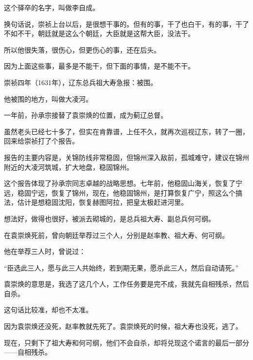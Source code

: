 \begin{multicols}{\theparacolNo}
这个驿卒的名字，叫做李自成。

换句话说，崇祯上台以后，是很想干事的。但有的事，干了也白干，有的事，干了不如不干，朝廷就是这么个朝廷，大臣就是这帮大臣，没法干。

所以他很失落，很伤心，但更伤心的事，还在后头。

因为上面这些事，最多是不能干，但下面的事情，是不能不干。

崇祯四年（1631年），辽东总兵祖大寿急报：被围。

他被围的地方，叫做大凌河。

一年前，孙承宗接替了袁崇焕的位置，成为蓟辽总督。

虽然老头已经七十多了，但实在肯靠谱，上任不久，就再次巡视辽东，转了一圈，回来给崇祯打了个报告。

报告的主要内容是，关锦防线非常稳固，但锦州深入敌前，孤城难守，建议在锦州附近的大凌河筑城，扩大地盘，稳固锦州。

这个报告体现了孙承宗同志卓越的战略思想。七年前，他稳固山海关，恢复了宁远，稳固宁远，恢复了锦州，现在，他稳固锦州，是打算恢复广宁，照这么个搞法，估计是想稳固沈阳，恢复赫图阿拉，把皇太极赶进河里。

想法好，做得也很好，被派去砌城的，是总兵祖大寿、副总兵何可纲。

在袁崇焕死前，曾向朝廷举荐过三个人，分别是赵率教、祖大寿、何可纲。

他在举荐三人时，曾说过：

“臣选此三人，愿与此三人共始终，若到期无果，愿杀此三人，然后自动请死。”

袁崇焕的意思是，我选了这几个人，工作任务要是完不成，我就先自相残杀，然后自杀。

这句话比较准，却也不太准。

因为袁崇焕还没死，赵率教就先死了。袁崇焕死的时候，祖大寿也没死，逃了。

现在，只剩下了祖大寿和何可纲，他们不会自杀，却将兑现这个诺言的最后一部分——自相残杀。
\ifnum{}
	\end{multicols}
\fi
\newpage
